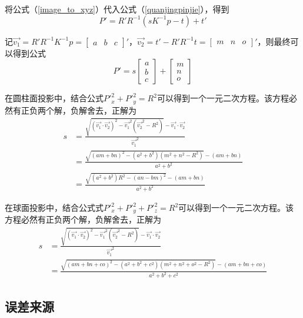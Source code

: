 将公式（\ref{image_to_xyz}）代入公式（\ref{quanjingpinjie}），得到
\begin{equation}
  P' = R' R^{-1} (s K^{-1} p - t) + t'
\end{equation}

记$\vec{v_1} = R' R^{-1} K^{-1} p = \begin{bmatrix}
    a & b & c
  \end{bmatrix}' $，$\vec{v_2} = t' - R' R^{-1} t = \begin{bmatrix}
    m & n & o
  \end{bmatrix}'$，则最终可以得到公式
\begin{equation} \label{get_P_}
  P' = s
  \begin{bmatrix}
    a \\ b \\ c
  \end{bmatrix}
  +
  \begin{bmatrix}
    m \\ n \\ o
  \end{bmatrix}
\end{equation}

在圆柱面投影中，结合公式${P'}_x^2 + {P'}_y^2 = R^2$可以得到一个一元二次方程。该方程必然有正负两个解，负解舍去，正解为
\begin{equation}
  \begin{split}
    s
    &= \frac{\sqrt{(\vec{v_1}\cdot\vec{v_2})^2 - \vec{v_1}^2(\vec{v_2}^2-R^2)} - \vec{v_1}\cdot\vec{v_2}}{\vec{v_1}^2} \\
    &= \frac{\sqrt{(am+bn)^2-(a^2+b^2)(m^2+n^2-R^2)}-(am+bn)}{a^2+b^2} \\
    &= \frac{\sqrt{(a^2+b^2)R^2 - (an-bm)^2}-(am+bn)}{a^2+b^2}
  \end{split}
\end{equation}

在球面投影中，结合公式式${P'}_x^2 + {P'}_y^2 + {P'}_z^2 = R^2$可以得到一个一元二次方程。该方程必然有正负两个解，负解舍去，正解为
\begin{equation}
  \begin{split}
    s
    &= \frac{\sqrt{(\vec{v_1}\cdot\vec{v_2})^2 - \vec{v_1}^2(\vec{v_2}^2-R^2)} - \vec{v_1}\cdot\vec{v_2}}{\vec{v_1}^2} \\
    &=\frac{\sqrt{(a m+b n+c o)^2-(a^2+b^2+c^2) (m^2+n^2+o^2-R^2)}-(am+bn+co)}{a^2+b^2+c^2}
  \end{split}
\end{equation}

\subsection{误差来源}
